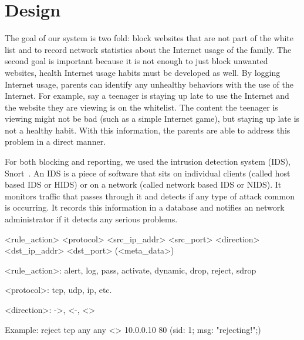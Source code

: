 
\section{Design}

The goal of our system is two fold: block websites that are not part of the
white list and to record network statistics about the Internet usage of the
family. The second goal is important because it is not enough to just block
unwanted websites, health Internet usage habits must be developed as well. By
logging Internet usage, parents can identify any unhealthy behaviors with the
use of the Internet. For example, say a teenager is staying up late to use the
Internet and the website they are viewing is on the whitelist. The content the
teenager is viewing might not be bad (such as a simple Internet game), but
staying up late is not a healthy habit. With this information, the parents are
able to address this problem in a direct manner.

For both blocking and reporting, we used the intrusion detection system (IDS),
Snort~\cite{snort}. An IDS is a piece of software that sits on individual
clients (called host based IDS or HIDS) or on a network (called network based
IDS or NIDS). It monitors traffic that passes through it and detects if any
type of attack common is occurring. It records this information in a database
and notifies an network administrator if it detects any serious problems.

\newcommand*\ifline[3]{%
        \ifthenelse{\value{VerbboxLineNo} = #1}{#2}{#3}}

\begin{verbbox}[\ifline{6}{\vspace{10pt}}{\ifline{10}{\vspace{3pt}}{\ifline{12}{\vspace{3pt}}{\ifline{14}{\vspace{10pt}}{}}}}]
<rule_action> <protocol>
    <src_ip_addr> <src_port>
    <direction>
    <dst_ip_addr> <dst_port>
    (<meta_data>)


<rule_action>: alert, log, pass, activate,
    dynamic, drop, reject, sdrop

<protocol>: tcp, udp, ip, etc.

<direction>: ->, <-, <>

Example: reject tcp any any <>
            10.0.0.10 80
            (sid: 1; msg: "rejecting!";)

\end{verbbox}

